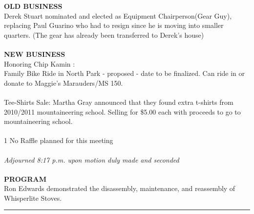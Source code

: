 \documentclass[10pt,a4paper]{article}
\begin{document}
\begin{multicols}{2}
\textbf{OLD BUSINESS}\\
Derek Stuart nominated and elected as Equipment Chairperson(Gear Guy), replacing Paul Guarino who had to resign since he is moving into smaller quarters. (The gear has already been transferred to Derek's house)
\\
\\
\textbf{NEW BUSINESS}\\
Honoring Chip Kamin :   \\
Family Bike Ride in North Park - proposed - date to be finalized. Can ride in or donate to Maggie's Marauders/MS 150.\\
\\
Tee-Shirts Sale: Martha Gray announced that they found extra t-shirts from 2010/2011 mountaineering school. Selling for \$5.00 each with proceeds to go to mountaineering school.\\\\1
No Raffle planned for this meeting\\
\\
\textit{Adjourned  8:17 p.m. upon motion duly made and seconded}
\\
\\
\textbf{PROGRAM}\\
Ron Edwards demonstrated the disassembly, maintenance, and reassembly of Whisperlite Stoves.

\hrule 


\end{multicols}
\end{document}

